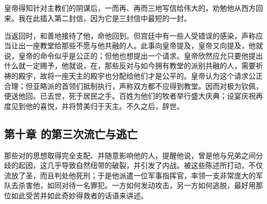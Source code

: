 
\subsection{}

皇帝得知针对主教们的阴谋后，一而再、再而三地写信给伟大的，劝勉他从西方回来。我在此插入第二封信，因为它是三封信中最短的一封。\par

\par

\par

当返回时，和善地接待了他，命他回到。但宫廷中有一些人受错误的感染，声称应当让出一座教堂给那些不愿与他共融的人。此事向皇帝提及，皇帝又向提及，他就说，皇帝的命令似乎是公正的；但他也想提出一个请求。皇帝欣然应允只要他提出什么就一定赐予，他就说，在，那些反对与如今拥有教堂的派别共融的人，需要祈祷的殿宇，故将一座天主的殿宇也分配给他们才是公平的。皇帝认为这个请求公正合理；但亚略派的首领们抵制执行，声称双方都不应得到教堂。因而对极为钦佩，便送他回。已去世，死于居民之手。百姓为他们的牧者举行盛大庆典；设宴庆祝再度见到他的喜悦，并将赞美归于天主。不久之后，辞世。\par


\subsection{第十章 的第三次流亡与逃亡}

那些对的思想取得完全支配、并随意影响他的人，提醒他说，曾是他与兄弟之间分歧的起因，这几乎导致自然纽带的破裂，并引发了内战。被这些陈述所打动，不仅流放了圣，而且判处他死刑；于是他派遣一位军事指挥官，率领一支非常庞大的军队去杀害他，如同对待一名罪犯。一方如何发动攻击，另一方如何逃脱，最好用那位如此受苦并如此奇妙得救者的话语来讲述。\par

